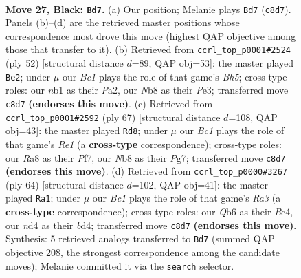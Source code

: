 \documentclass[11pt]{article}
\begin{document}
\clearpage

\begin{figure}[p]\centering
\begin{subfigure}{0.46\textwidth}\centering
\resizebox{\linewidth}{!}{%
\newchessgame
\chessboard[
  setfen={rnb1nk2/1p5p/1q5p/p4p1P/P1PN3P/5B2/8/RN1Q2K1 b - - 1 27},
  showmover=false,
  pgfstyle=straightmove, color=movearrow, markmove={c8-d7}
]}
\caption{}
\end{subfigure}\hfill
\begin{subfigure}{0.46\textwidth}\centering
\resizebox{\linewidth}{!}{%
\newchessgame
\chessboard[
  setfen={3r2k1/1p2p1bp/1Npqb3/Q3n1pB/1P6/4P1B1/P4PP1/R5K1 w - - 2 27},
  showmover=false,
  pgfstyle=straightmove, color=movearrow, markmove={h5-e2}
]}
\caption{}
\end{subfigure}
\\[4pt]
\begin{subfigure}{0.46\textwidth}\centering
\resizebox{\linewidth}{!}{%
\newchessgame
\chessboard[
  setfen={4r1k1/pp3ppn/1q5p/5P2/2P1p1PP/1PN1R3/1P1Q4/1K6 b - - 1 34},
  showmover=false,
  pgfstyle=straightmove, color=movearrow, markmove={e8-d8}
]}
\caption{}
\end{subfigure}\hfill
\begin{subfigure}{0.46\textwidth}\centering
\resizebox{\linewidth}{!}{%
\newchessgame
\chessboard[
  setfen={4r2k/1p6/p2pq3/P1pn1pB1/2Bb3P/R4P2/1P1Q3P/7K w - - 2 33},
  showmover=false,
  pgfstyle=straightmove, color=movearrow, markmove={a3-a1}
]}
\caption{}
\end{subfigure}
\caption{\textbf{Move 27, Black: \texttt{Bd7}.} (a) Our position; Melanie plays \texttt{Bd7} (\texttt{c8d7}). Panels (b)--(d) are the retrieved master positions whose correspondence most drove this move (highest QAP objective among those that transfer to it). (b) Retrieved from \texttt{ccrl\_top\_p0001\#2524} (ply 52) [structural distance $d$=89, QAP obj=53]: the master played \texttt{Be2}; under $\mu$ our \emph{Bc1} plays the role of that game's \emph{Bh5}; cross-type roles: our \emph{n}b1 as their \emph{P}a2, our \emph{N}b8 as their \emph{P}e3; transferred move \texttt{c8d7} \textbf{(endorses this move)}. (c) Retrieved from \texttt{ccrl\_top\_p0001\#2592} (ply 67) [structural distance $d$=108, QAP obj=43]: the master played \texttt{Rd8}; under $\mu$ our \emph{Bc1} plays the role of that game's \emph{Re1} (a \textbf{cross-type} correspondence); cross-type roles: our \emph{R}a8 as their \emph{P}f7, our \emph{N}b8 as their \emph{P}g7; transferred move \texttt{c8d7} \textbf{(endorses this move)}. (d) Retrieved from \texttt{ccrl\_top\_p0000\#3267} (ply 64) [structural distance $d$=102, QAP obj=41]: the master played \texttt{Ra1}; under $\mu$ our \emph{Bc1} plays the role of that game's \emph{Ra3} (a \textbf{cross-type} correspondence); cross-type roles: our \emph{Q}b6 as their \emph{B}c4, our \emph{n}d4 as their \emph{b}d4; transferred move \texttt{c8d7} \textbf{(endorses this move)}. Synthesis: 5 retrieved analogs transferred to \texttt{Bd7} (summed QAP objective 208, the strongest correspondence among the candidate moves); Melanie committed it via the \texttt{search} selector.}
\label{fig:thought-m53}
\end{figure}
\end{document}
